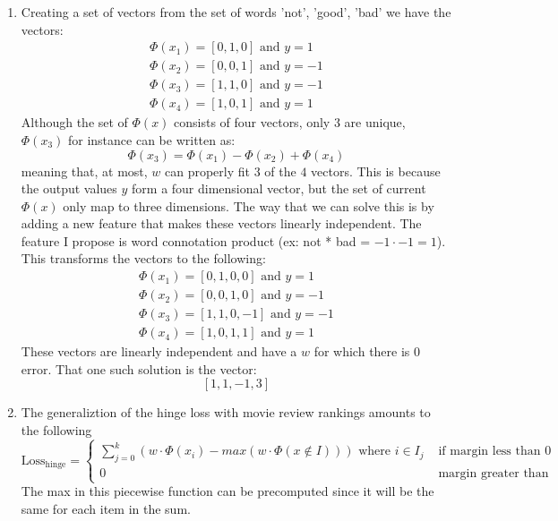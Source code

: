 \documentclass[12pt]{article}
\begin{document}
\begin{enumerate}[label=(\alph*)]
		\item Creating a set of vectors from the set of words {'not', 'good', 'bad'}
			we have the vectors:
			\begin{gather*}
				\Phi(x_1) = [0, 1, 0] \text{ and } y = 1 \\
				\Phi(x_2) = [0, 0, 1] \text{ and } y = -1 \\
				\Phi(x_3) = [1, 1, 0] \text{ and } y = -1 \\
				\Phi(x_4) = [1, 0, 1] \text{ and } y = 1
			\end{gather*}
			Although the set of \(\Phi(x)\) consists of four vectors, only 3 are
			unique, \(\Phi(x_3)\) for instance can be written as:
			\[
				\Phi(x_3) = \Phi(x_1) - \Phi(x_2) + \Phi(x_4)
			\]
			meaning that, at most, \(w\) can properly fit \(3\) of the \(4\)
			vectors. This is because the output values \(y\) form a four
			dimensional vector, but the set of current \(\Phi(x)\) only
			map to three dimensions. The way that we can solve this is by 
			adding a new feature that makes these vectors linearly independent.
			The feature I propose is word connotation product
			(ex: not * bad = \(-1 \cdot -1 = 1\)).
			This transforms the vectors to the following:
			\begin{gather*}
				\Phi(x_1) = [0, 1, 0, 0] \text{ and } y = 1 \\
				\Phi(x_2) = [0, 0, 1, 0] \text{ and } y = -1 \\
				\Phi(x_3) = [1, 1, 0, -1] \text{ and } y = -1 \\
				\Phi(x_4) = [1, 0, 1, 1] \text{ and } y = 1
			\end{gather*}
			These vectors are linearly independent and have a \(w\)
			for which there is \(0\) error. That one such solution
			is the vector:
			\[
				[1, 1, -1, 3]
			\]

		\item The generaliztion of the hinge loss with movie review
			rankings amounts to the following
			\[
				\text{Loss}_\text{hinge} =
					\begin{cases}
						\sum_{j=0}^k (w \cdot \Phi(x_i) - max(w \cdot \Phi(x\notin I))) \text{ where } i \in I_j & \text{ if margin less than 0 } \\
						0 & \text{ margin greater than 1 } 
					\end{cases}
			\]
			The max in this piecewise function can be precomputed since it will be the same for each item in the sum.

	\end{enumerate}
\end{document}

